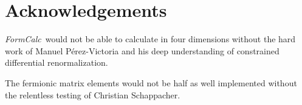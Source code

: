 \documentclass[twoside,11pt]{article}
\def\FC{\textit{FormCalc}}
\begin{document}
\section*{Acknowledgements}

\FC\ would not be able to calculate in four dimensions without the hard
work of Manuel P\'erez-Victoria and his deep understanding of constrained
differential renormalization.

The fermionic matrix elements would not be half as well implemented
without the relentless testing of Christian Schappacher.


\printindex
\end{document}
